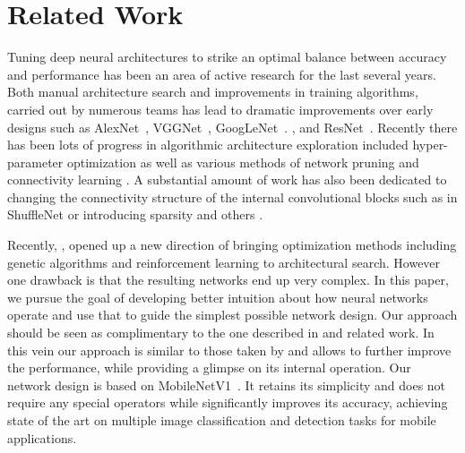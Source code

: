 \documentclass[10pt,twocolumn,letterpaper]{article}
\begin{document}
\section{Related Work}
Tuning deep neural architectures to strike an optimal balance between accuracy and performance has been an area of active research for the last several years.
Both manual architecture search and improvements in training algorithms, carried out by numerous teams has lead to dramatic improvements over early designs  such as \mbox{AlexNet}~\cite{AlexNet}, \mbox{VGGNet}~\cite{VGGNet}, \mbox{GoogLeNet}~\cite{GoogleNet}. , and \mbox{ResNet}~\cite{ResNet}.
Recently there has been lots of progress in algorithmic architecture exploration included hyper-parameter optimization \cite{BergstraRandomSearch, BayesianOptimizationML, BayesianOptimizationDNN} as well as various methods of network pruning \cite{BrainSurgeon,BrainDamage,Han2015,Han2016,Guo2016,LiPruning} and connectivity learning \cite{ConnectivityLearning,BudgetedSuperNetworks}.
A substantial amount of work has also been dedicated to changing the connectivity structure of the internal convolutional blocks such as in \mbox{ShuffleNet} \cite{ShuffleNet2017} or introducing sparsity \cite{PowerOfSparsity} and others \cite{SpatialBottleneck2016}. 

Recently, \cite{LearningToLearnScale,GeneticCNN,EvolutionImageClassifiers,NAS_reinforcement}, opened up a new direction of bringing optimization methods including genetic algorithms and reinforcement learning to architectural search.
However one drawback is that the resulting networks end up very complex.
In this paper, we pursue the goal of developing better intuition about how neural networks operate and use that to guide the simplest possible network design.
Our approach should be seen as complimentary to the one described in \cite{LearningToLearnScale} and related work.
In this vein our approach is similar to those taken by \cite{ShuffleNet2017, SpatialBottleneck2016} and allows to further improve the performance, while providing a glimpse on its internal operation.
Our network design is based on \mbox{MobileNetV1}~\cite{MobilenetV1}. It retains its simplicity and  does not require any special operators while significantly improves its accuracy, achieving state of the art on multiple image classification and detection tasks for mobile applications. 
%
%
%

%
\newcommand{\fig}[1]{Fig.~\ref{#1}}
\newcommand{\beveco}{Best viewed in color.}
\def\interior{\operatorname{interior}}
\end{document}
